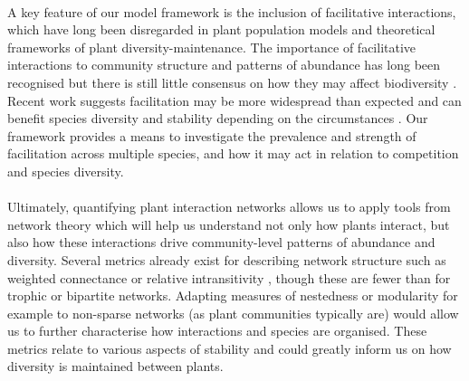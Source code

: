 \documentclass[a4,12pt]{article}
\begin{document}
        \paragraph{}
        A key feature of our model framework is the inclusion of facilitative interactions, which have long been disregarded in plant population models and theoretical frameworks of plant diversity-maintenance. The importance of facilitative interactions to community structure and patterns of abundance has long been recognised \citep{Callaway1997a} but there is still little consensus on how they may affect biodiversity \citep{Bruno2003}. Recent work suggests facilitation may be more widespread than expected \citep{Gross2015, Picoche2020} and can  benefit species diversity and stability depending on the circumstances \citep{Coyte2015, Brooker2008}. Our framework provides a means to investigate the prevalence and strength of facilitation across multiple species, and how it may act in relation to competition and species diversity.  
        
        \paragraph{}
        Ultimately, quantifying plant interaction networks allows us to apply tools from network theory which will help us understand not only how plants interact, but also how these interactions drive community-level patterns of abundance and diversity. Several metrics already exist for describing network structure such as weighted connectance \citep{Ulanowicz1991} or relative intransitivity \citep{Laird2006a}, though these are fewer than for trophic or bipartite networks. Adapting measures of nestedness or modularity for example to non-sparse networks (as plant communities typically are) would allow us to further characterise how interactions and species are organised. These metrics relate to various aspects of stability and could greatly inform us on how diversity is maintained between plants. 

\end{document}
